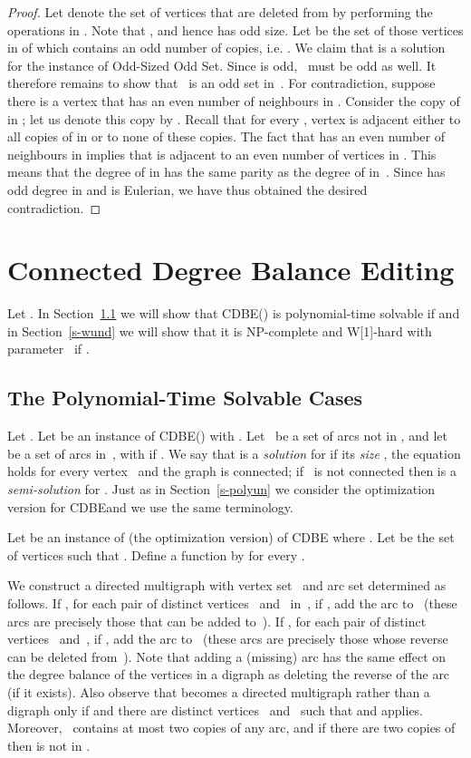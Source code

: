 \documentclass[11pt]{llncs}
\newcommand{\cdbe}{{\sc CDBE}}
\newcommand{\NP}{{\sf NP}}
\newcommand{\W}{{\sf W[1]}}
\begin{document}
\begin{proof}
Let  denote the set of vertices that are deleted from
 by performing the operations in . Note that , and hence
 has odd size. Let  be the set of those vertices in  of
which  contains an odd number of copies, i.e. . We claim that  is a
solution for the instance  of {\sc Odd-Sized Odd Set}. Since  is
odd,~ must be odd as well. It therefore remains to show that~ is an odd
set in~. For contradiction, suppose there is a vertex  that
has an even number of neighbours in . Consider the copy of  in ; let us denote this copy by . Recall that for every ,
vertex  is adjacent either to all copies of  in  or to none of
these copies. The fact that  has an even number of neighbours in  implies
that  is adjacent to an even number of vertices in . This means that
the degree of  in  has the same parity as the degree of  in~.
Since  has odd degree in  and  is Eulerian, we have thus obtained
the desired contradiction.
\end{proof}


\section{Connected Degree Balance Editing}\label{sec:directed}

Let .  In Section~\ref{s-polyund} 
we will show that
\cdbe() is polynomial-time solvable if  and
in Section~\ref{s-wund} we will show 
that it is \NP-complete
and \W-hard with parameter~ if .

\subsection{The Polynomial-Time Solvable Cases}\label{s-polyund} 

Let  .  
Let
 be an instance of \cdbe() with . Let~ be a set of
arcs not in , and let~ be a set of arcs in~, with  if
.  We say that  is a {\em solution} for  if its
{\em size} , the equation  holds for every vertex~ and
the graph  is connected; if~ is not connected
then  is a {\em semi-solution} for .  Just as in
Section~\ref{s-polyun} 
we consider the optimization version for \cdbe and we use the same terminology.

Let  be an instance of (the optimization version) of \cdbe
where .  Let  be the set of vertices  such that
.  Define a function  by  for every
. 

We construct a directed multigraph  with vertex set~ 
and arc set
determined as follows.
If , for each pair of distinct
vertices~ and~ in~, if , add the arc  to~
(these arcs are precisely those that can be added to~). If ,
for each pair of distinct vertices~ and~, if , add the
arc  to~ (these arcs are precisely those whose reverse can be
deleted from~). Note that adding a
(missing)
arc has the same effect on the degree
balance of the vertices in a digraph as deleting the reverse of the arc 
(if it exists).
Also 
observe that  becomes a directed multigraph rather than a digraph only if
 and there are distinct vertices~ and~ such that  and  applies.  Moreover,~ contains at most two
copies of any arc, and if there are two copies of  then  is not
in .
\end{document}
